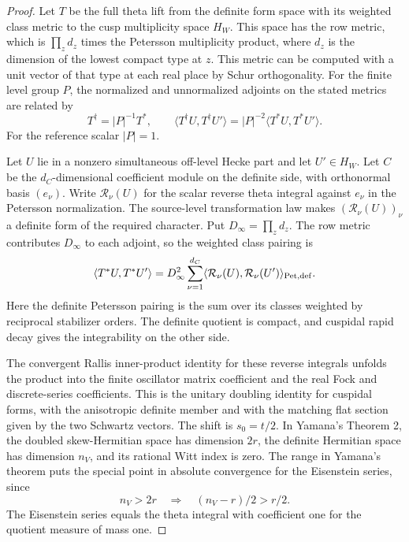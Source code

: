 \begin{proof}
Let \(T\) be the full theta lift from the definite form
space with its weighted class metric to the cusp
multiplicity space \(H_W\). This space has the row
metric, which is \(\prod_z d_z\) times the Petersson
multiplicity product, where \(d_z\) is the dimension
of the lowest compact type at \(z\). This metric can
be computed with a unit vector of that type at each
real place by Schur orthogonality. For the finite level group \(P\), the normalized and
unnormalized adjoints on the stated metrics are related by
\[
 T^\dagger=|P|^{-1}T^*,\qquad
 \langle T^\dagger U,T^\dagger U'\rangle
    = |P|^{-2}\langle T^*U,T^*U'\rangle .
\]
For the reference scalar \(|P|=1\).

Let \(U\) lie in a nonzero simultaneous off-level Hecke
part and let \(U'\in H_W\). Let \(C\) be the \(d_C\)-dimensional coefficient module
on the definite side, with orthonormal basis \((e_\nu)\).
Write \(\mathcal R_\nu(U)\) for the scalar reverse
theta integral against \(e_\nu\) in the Petersson
normalization. The source-level transformation law makes
\((\mathcal R_\nu(U))_\nu\) a definite form of the required
character. Put \(D_\infty=\prod_z d_z\). The row metric
contributes \(D_\infty\) to each adjoint, so the weighted
class pairing is
\[
 \langle T^*U,T^*U'\rangle
   =D_\infty^2\sum_{\nu=1}^{d_C}
      \langle\mathcal R_\nu(U),\mathcal R_\nu(U')\rangle_{\rm Pet,def}.
\]
Here the definite Petersson pairing is the sum over its
classes weighted by reciprocal stabilizer orders. The definite quotient is compact,
and cuspidal rapid decay gives the integrability on
the other side.

The convergent Rallis inner-product identity for these
reverse integrals unfolds the product into the finite
oscillator matrix coefficient and the real Fock and
discrete-series coefficients. This is the unitary
doubling identity for cuspidal forms, with the
anisotropic definite member and with the matching
flat section given by the two Schwartz vectors. The
shift is \(s_0=t/2\). In Yamana's Theorem 2, the
doubled skew-Hermitian space has dimension \(2r\),
the definite Hermitian space has dimension \(n_V\),
and its rational Witt index is zero. The range in Yamana's theorem puts the special point in absolute convergence for the Eisenstein series, since
\[
 n_V>2r\quad\Longrightarrow\quad (n_V-r)/2>r/2 .
\] The
Eisenstein series equals the theta integral with
coefficient one for the quotient measure of mass one.


\end{proof}
